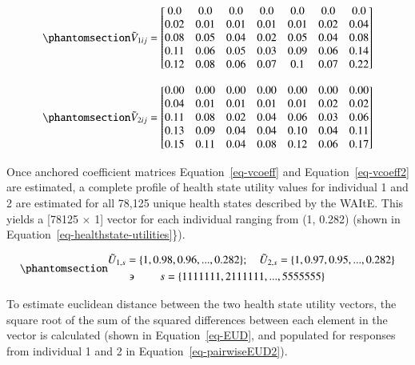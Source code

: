 \documentclass[
  number,
  preprint]{elsarticle}
\begin{document}
\begin{equation}\phantomsection\label{eq-vcoeff}{
\tilde{V}_{1ij} =  
\begin{bmatrix}
0.0 & 0.0 & 0.0 & 0.0 & 0.0 & 0.0 & 0.0 \\
0.02 & 0.01 & 0.01 & 0.01 & 0.01 & 0.02 & 0.04 \\
0.08 & 0.05 & 0.04 & 0.02 & 0.05 & 0.04 & 0.08 \\
0.11 & 0.06 & 0.05 & 0.03 & 0.09 & 0.06 & 0.14 \\
0.12 & 0.08 & 0.06 & 0.07 & 0.1 & 0.07 & 0.22
\end{bmatrix}
}\end{equation}

\begin{equation}\phantomsection\label{eq-vcoeff2}{
\tilde{V}_{2ij} =  
\begin{bmatrix}
0.00 & 0.00 & 0.00 & 0.00 & 0.00 & 0.00 & 0.00 \\
0.04 & 0.01 & 0.01 & 0.01 & 0.01 & 0.02 & 0.02 \\
0.11 & 0.08 & 0.02 & 0.04 & 0.06 & 0.03 & 0.06 \\
0.13 & 0.09 & 0.04 & 0.04 & 0.10 & 0.04 & 0.11 \\
0.15 & 0.11 & 0.04 & 0.08 & 0.12 & 0.06 & 0.17
\end{bmatrix}
}\end{equation}

Once anchored coefficient matrices Equation~\ref{eq-vcoeff} and
Equation~\ref{eq-vcoeff2} are estimated, a complete profile of health
state utility values for individual 1 and 2 are estimated for all 78,125
unique health states described by the WAItE. This yields a {[}78125
\(\times\) 1{]} vector for each individual ranging from (1, 0.282)
(shown in Equation~\ref{eq-healthstate-utilities}\}).

\begin{equation}\phantomsection\label{eq-healthstate-utilities}{
\begin{aligned}  
\tilde{U}_{1,s} &=  \{1, 0.98, 0.96, ..., 0.282\}; \quad \tilde{U}_{2,s} =  \{1, 0.97, 0.95, ..., 0.282\} \\
&\backepsilon \quad \quad s = \{1111111, 2111111, ..., 5555555\}
\end{aligned}
}\end{equation}

To estimate euclidean distance between the two health state utility
vectors, the square root of the sum of the squared differences between
each element in the vector is calculated (shown in
Equation~\ref{eq-EUD}, and populated for responses from individual 1 and
2 in Equation~\ref{eq-pairwiseEUD2}).
\end{document}
